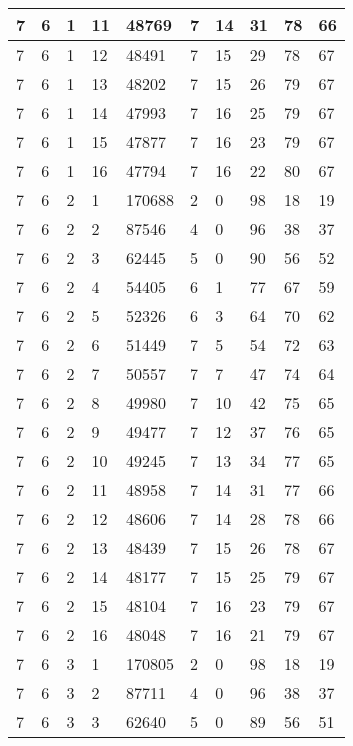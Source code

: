 \begin{table}[!ht]
\begin{tabular}{|l|l|l|l|l|l|l|l|l|l|}
        7 & 6 & 1 & 11 & 48769 & 7 & 14 & 31 & 78 & 66 \\ \hline
        7 & 6 & 1 & 12 & 48491 & 7 & 15 & 29 & 78 & 67 \\ \hline
        7 & 6 & 1 & 13 & 48202 & 7 & 15 & 26 & 79 & 67 \\ \hline
        7 & 6 & 1 & 14 & 47993 & 7 & 16 & 25 & 79 & 67 \\ \hline
        7 & 6 & 1 & 15 & 47877 & 7 & 16 & 23 & 79 & 67 \\ \hline
        7 & 6 & 1 & 16 & 47794 & 7 & 16 & 22 & 80 & 67 \\ \hline
        7 & 6 & 2 & 1 & 170688 & 2 & 0 & 98 & 18 & 19 \\ \hline
        7 & 6 & 2 & 2 & 87546 & 4 & 0 & 96 & 38 & 37 \\ \hline
        7 & 6 & 2 & 3 & 62445 & 5 & 0 & 90 & 56 & 52 \\ \hline
        7 & 6 & 2 & 4 & 54405 & 6 & 1 & 77 & 67 & 59 \\ \hline
        7 & 6 & 2 & 5 & 52326 & 6 & 3 & 64 & 70 & 62 \\ \hline
        7 & 6 & 2 & 6 & 51449 & 7 & 5 & 54 & 72 & 63 \\ \hline
        7 & 6 & 2 & 7 & 50557 & 7 & 7 & 47 & 74 & 64 \\ \hline
        7 & 6 & 2 & 8 & 49980 & 7 & 10 & 42 & 75 & 65 \\ \hline
        7 & 6 & 2 & 9 & 49477 & 7 & 12 & 37 & 76 & 65 \\ \hline
        7 & 6 & 2 & 10 & 49245 & 7 & 13 & 34 & 77 & 65 \\ \hline
        7 & 6 & 2 & 11 & 48958 & 7 & 14 & 31 & 77 & 66 \\ \hline
        7 & 6 & 2 & 12 & 48606 & 7 & 14 & 28 & 78 & 66 \\ \hline
        7 & 6 & 2 & 13 & 48439 & 7 & 15 & 26 & 78 & 67 \\ \hline
        7 & 6 & 2 & 14 & 48177 & 7 & 15 & 25 & 79 & 67 \\ \hline
        7 & 6 & 2 & 15 & 48104 & 7 & 16 & 23 & 79 & 67 \\ \hline
        7 & 6 & 2 & 16 & 48048 & 7 & 16 & 21 & 79 & 67 \\ \hline
        7 & 6 & 3 & 1 & 170805 & 2 & 0 & 98 & 18 & 19 \\ \hline
        7 & 6 & 3 & 2 & 87711 & 4 & 0 & 96 & 38 & 37 \\ \hline
        7 & 6 & 3 & 3 & 62640 & 5 & 0 & 89 & 56 & 51 \\ \hline

\end{tabular}
\end{table}
